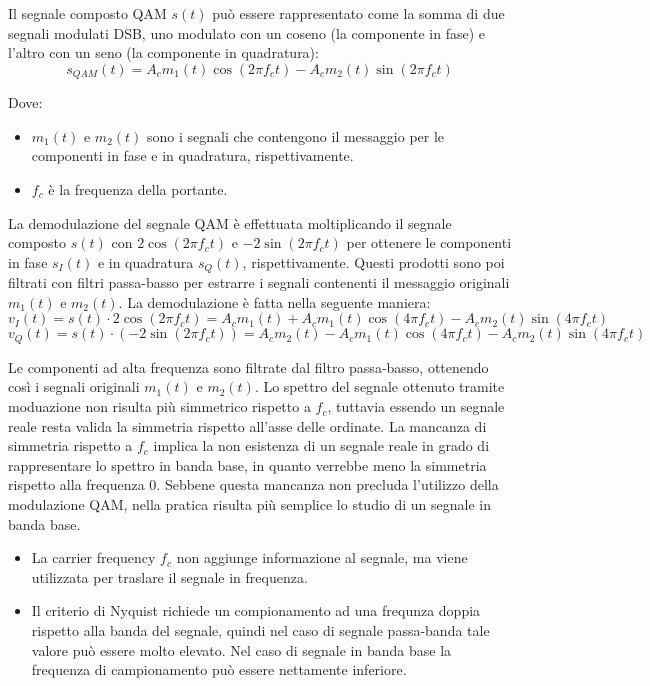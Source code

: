 Il segnale composto QAM \( s(t) \) può essere rappresentato come la somma di due segnali modulati DSB, uno modulato con un coseno (la componente in fase) e l'altro con un seno (la componente in quadratura):
\begin{equation}
    s_{QAM}(t) = A_{c} m_1(t) \cos(2\pi f_c t) - A_{c} m_2(t) \sin(2\pi f_c t)
\end{equation}

Dove:
\begin{itemize}
    \item \( m_1(t) \) e \( m_2(t) \) sono i segnali che contengono il messaggio per le componenti in fase e in quadratura, rispettivamente.
    \item \( f_c \) è la frequenza della portante.
\end{itemize}


La demodulazione del segnale QAM è effettuata moltiplicando il segnale composto \( s(t) \) con \( 2\cos(2\pi f_c t) \) e \( -2\sin(2\pi f_c t) \) per ottenere le componenti in fase \( s_I(t) \) e in quadratura \( s_Q(t) \), rispettivamente.
Questi prodotti sono poi filtrati con filtri passa-basso per estrarre i segnali contenenti il messaggio originali \( m_1(t) \) e \( m_2(t) \).
La demodulazione è fatta nella seguente maniera:
\begin{equation}
    v_I(t) = s(t) \cdot 2\cos(2\pi f_c t) = A_{c} m_1(t) + A_{c} m_1(t) \cos(4\pi f_c t) - A_{c} m_2(t) \sin(4\pi f_c t)
\end{equation}
\begin{equation}
    v_Q(t) = s(t) \cdot (-2\sin(2\pi f_c t)) = A_{c} m_2(t) - A_{c} m_1(t) \cos(4\pi f_c t) - A_{c} m_2(t) \sin(4\pi f_c t)
\end{equation}

Le componenti ad alta frequenza sono filtrate dal filtro passa-basso, ottenendo così i segnali originali \( m_1(t) \) e \( m_2(t) \).
Lo spettro del segnale ottenuto tramite moduazione non risulta più simmetrico rispetto a $f_c$, tuttavia essendo un segnale reale resta valida la simmetria rispetto all'asse delle ordinate.
La mancanza di simmetria rispetto a $f_c$ implica la non esistenza di un segnale reale in grado di rappresentare lo spettro in banda base, in quanto verrebbe meno la simmetria rispetto alla frequenza 0.
Sebbene questa mancanza non precluda l'utilizzo della modulazione QAM, nella pratica risulta più semplice lo studio di un segnale in banda base.
\begin{itemize}
    \item La carrier frequency \( f_c \) non aggiunge informazione al segnale, ma viene utilizzata per traslare il segnale in frequenza.
    \item Il criterio di Nyquist richiede un compionamento ad una frequnza doppia rispetto alla banda del segnale, quindi nel caso di segnale passa-banda tale valore può essere molto elevato. Nel caso di segnale in banda base la frequenza di campionamento può essere nettamente inferiore.
\end{itemize}


